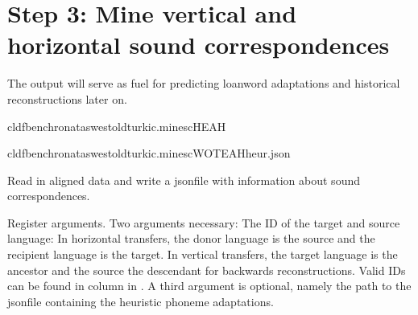 \documentclass[letterpaper,10pt,english]{sphinxmanual}
\begin{document}
\section{Step 3: Mine vertical and horizontal sound correspondences}
\label{\detokenize{mkloanpy:step-3-mine-vertical-and-horizontal-sound-correspondences}}
\sphinxAtStartPar
The output will serve as fuel for predicting loanword adaptations and
historical reconstructions later on.

\begin{sphinxVerbatim}[commandchars=\\\{\}]
cldfbenchronataswestoldturkic.minescHEAH
\end{sphinxVerbatim}

\begin{sphinxVerbatim}[commandchars=\\\{\}]
cldfbenchronataswestoldturkic.minescWOTEAHheur.json
\end{sphinxVerbatim}
\label{\detokenize{mkloanpy:module-ronataswestoldturkiccommands.minesc}}
\sphinxAtStartPar
Read in aligned data and write a json\sphinxhyphen{}file with information about sound
correspondences.

\begin{fulllineitems}
\label{\detokenize{mkloanpy:ronataswestoldturkiccommands.minesc.register}}
\pysigstartsignatures
{}
\pysigstopsignatures
\sphinxAtStartPar
Register arguments. Two arguments necessary: The ID of the target and
source language: In horizontal transfers, the donor language is the source
and the recipient language is the target. In vertical transfers, the
target language is the ancestor and the source the descendant for backwards
reconstructions. Valid IDs can be found in
column  in . A third argument is optional,
namely the path to the json\sphinxhyphen{}file containing the heuristic phoneme
adaptations.

\end{fulllineitems}
\end{document}
